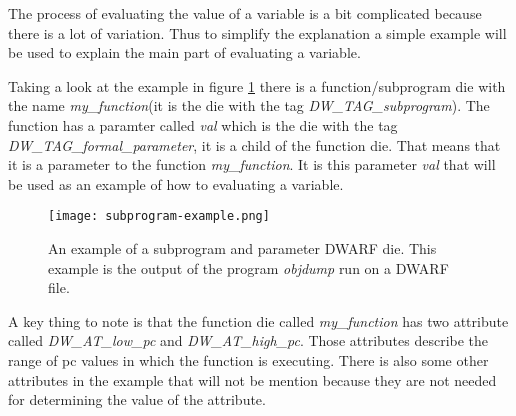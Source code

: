  


The process of evaluating the value of a variable is a bit complicated because there is a lot of variation.
Thus to simplify the explanation a simple example will be used to explain the main part of evaluating a variable.


Taking a look at the example in figure \ref{fig:subprogramexample} there is a function/subprogram \gls{die} with the name \emph{my\_function}(it is the \gls{die} with the tag \emph{DW\_TAG\_subprogram}).
The function has a paramter called \emph{val} which is the \gls{die} with the tag \emph{DW\_TAG\_formal\_parameter}, it is a child of the function \gls{die}.
That means that it is a parameter to the function \emph{my\_function}.
It is this parameter \emph{val} that will be used as an example of how to evaluating a variable.


\begin{figure}[h]
	\centering
	\texttt{[image: subprogram-example.png]}
	\caption{An example of a subprogram and parameter \gls{DWARF} \gls{die}. This example is the output of the program \emph{objdump} run on a \gls{DWARF} file.}
	\label{fig:subprogramexample}
\end{figure}


A key thing to note is that the function \gls{die} called \emph{my\_function} has two attribute called \emph{DW\_AT\_low\_pc} and \emph{DW\_AT\_high\_pc}.
Those attributes describe the range of \gls{pc} values in which the function is executing.
There is also some other attributes in the example that will not be mention because they are not needed for determining the value of the attribute.





